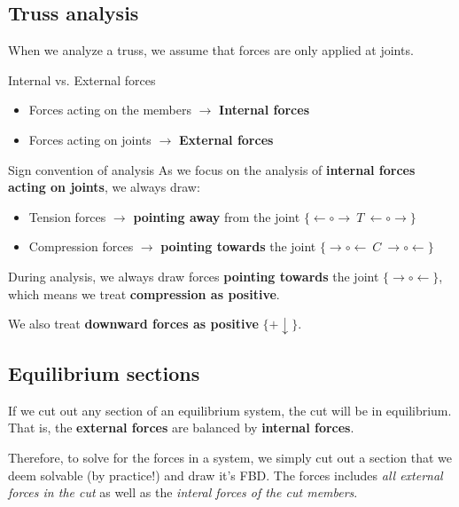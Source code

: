 \documentclass{article}
\begin{document}
\subsection{Truss analysis}
When we analyze a truss, we assume that forces are only applied at joints.
\begin{knBox}
    {Internal vs. External forces}
    \begin{itemize}
        \item Forces acting on the members $\to$ \textbf{Internal forces}
        \item Forces acting on joints $\to$ \textbf{External forces}
    \end{itemize}
\end{knBox}
\begin{definition}
    {Sign convention of analysis}
    As we focus on the analysis of \textbf{internal forces acting on joints}, we always draw:
    \begin{itemize}
        \item Tension forces $\to$ \textbf{pointing away} from the joint $\{\leftarrow\circ\boxed{\rightarrow\ T\ \leftarrow}\circ\rightarrow\}$
        \item Compression forces $\to$ \textbf{pointing towards} the joint $\{\rightarrow\circ\boxed{\leftarrow\ C\ \rightarrow}\circ\leftarrow\}$
    \end{itemize}
    During analysis, we always draw forces \textbf{pointing towards} the joint $\{\rightarrow\circ\leftarrow\}$, which means we treat \textbf{compression as positive}.

    We also treat \textbf{downward forces as positive} $\{+\downarrow\}$.
\end{definition}
\subsection{Equilibrium sections}
If we cut out any section of an equilibrium system, the cut will be in equilibrium. That is, the \textbf{external forces} are balanced by \textbf{internal forces}.

Therefore, to solve for the forces in a system, we simply cut out a section that we deem solvable (by practice!) and draw it's FBD. The forces includes \emph{all external forces in the cut} as well as the \emph{interal forces of the cut members}.
\end{document}
